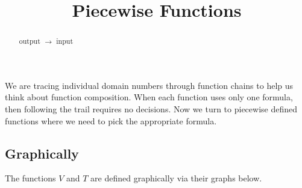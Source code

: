 \documentclass{ximera}
\title{Piecewise Functions}
\begin{document}
\begin{abstract}
output $\rightarrow$ input
\end{abstract}
\maketitle


We are tracing individual domain numbers through function chains to help us think about function composition.  When each function uses only one formula, then following the trail requires no decisions.  Now we turn to piecewise defined functions where we need to pick the appropriate formula.








\subsection*{Graphically}




The functions $V$ and $T$ are defined graphically via their graphs below.  
\end{document}
